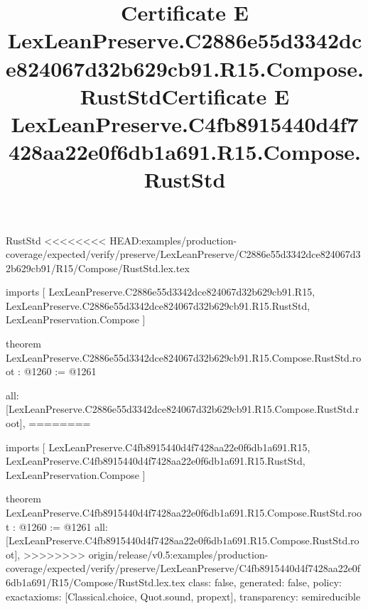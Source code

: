 \begin{lexlean}{RustStd}
<<<<<<<< HEAD:examples/production-coverage/expected/verify/preserve/LexLeanPreserve/C2886e55d3342dce824067d32b629cb91/R15/Compose/RustStd.lex.tex
\title{Certificate E LexLeanPreserve.C2886e55d3342dce824067d32b629cb91.R15.Compose.RustStd}
\begin{coremodule}
imports [
  LexLeanPreserve.C2886e55d3342dce824067d32b629cb91.R15,
  LexLeanPreserve.C2886e55d3342dce824067d32b629cb91.R15.RustStd,
  LexLeanPreservation.Compose
]

theorem LexLeanPreserve.C2886e55d3342dce824067d32b629cb91.R15.Compose.RustStd.root : @1260 := @1261 {
  all: [LexLeanPreserve.C2886e55d3342dce824067d32b629cb91.R15.Compose.RustStd.root],
========
\title{Certificate E LexLeanPreserve.C4fb8915440d4f7428aa22e0f6db1a691.R15.Compose.RustStd}
\begin{coremodule}
imports [
  LexLeanPreserve.C4fb8915440d4f7428aa22e0f6db1a691.R15,
  LexLeanPreserve.C4fb8915440d4f7428aa22e0f6db1a691.R15.RustStd,
  LexLeanPreservation.Compose
]

theorem LexLeanPreserve.C4fb8915440d4f7428aa22e0f6db1a691.R15.Compose.RustStd.root : @1260 := @1261 {
  all: [LexLeanPreserve.C4fb8915440d4f7428aa22e0f6db1a691.R15.Compose.RustStd.root],
>>>>>>>> origin/release/v0.5:examples/production-coverage/expected/verify/preserve/LexLeanPreserve/C4fb8915440d4f7428aa22e0f6db1a691/R15/Compose/RustStd.lex.tex
  class: false,
  generated: false,
  policy: exact{axioms: [Classical.choice, Quot.sound, propext]},
  transparency: semireducible
}


\end{coremodule}}
\end{coremodule}
\end{lexlean}
